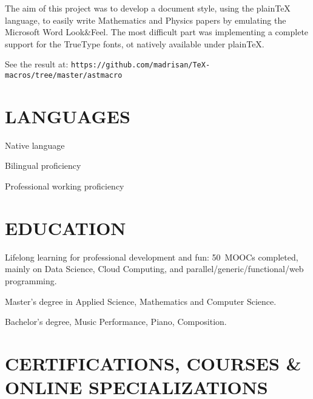 The aim of this project was to develop a document style, using the plainTeX language, 
to easily write Mathematics and Physics papers by emulating the Microsoft Word 
Look\&Feel.
The most difficult part was implementing a complete support for the TrueType fonts,
ot natively available under plain\TeX.

See the result at:
\hfill\break\noindent
{\tt https:/\negthinspace/github.com/madrisan/TeX-macros/tree/master/astmacro}


\section{LANGUAGES}

Native language

Bilingual proficiency

Professional working proficiency


\section{EDUCATION}

\vskip -6pt

Lifelong learning for professional development and fun:
50\smallplus~MOOCs completed, mainly on Data Science, Cloud Computing,
and parallel/generic/functional/web programming.


Master's degree in Applied Science, Mathematics and Computer Science.


Bachelor's degree, Music Performance, Piano, Composition.


\section{CERTIFICATIONS, COURSES \& ONLINE SPECIALIZATIONS}

